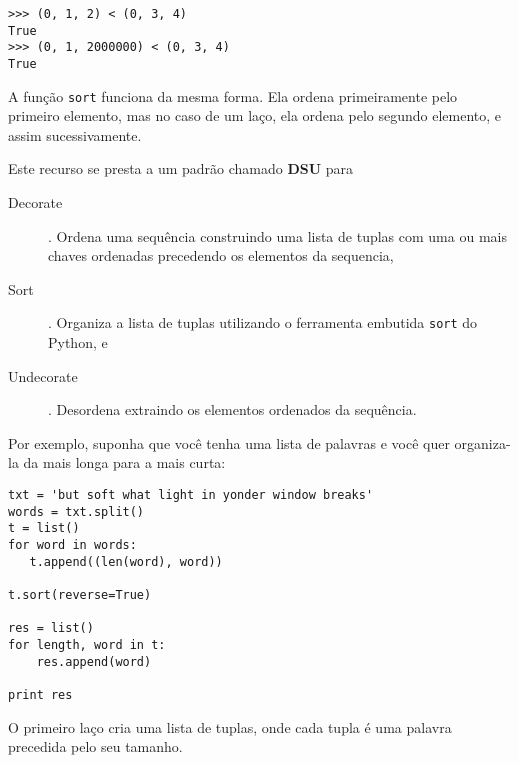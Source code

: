 \beforeverb
\begin{verbatim}
>>> (0, 1, 2) < (0, 3, 4)
True
>>> (0, 1, 2000000) < (0, 3, 4)
True
\end{verbatim}
\afterverb
%
A função {\tt sort} funciona da mesma forma. Ela ordena
primeiramente pelo primeiro elemento, mas no caso de um laço,
ela ordena pelo segundo elemento, e assim sucessivamente.

Este recurso se presta a um padrão chamado {\bf DSU} para

\begin{description}

\item[Decorate]. Ordena uma sequência construindo uma lista de tuplas
com uma ou mais chaves ordenadas precedendo os elementos da sequencia,

\item[Sort]. Organiza a lista de tuplas utilizando o ferramenta embutida 
{\tt sort} do Python, e

\item[Undecorate]. Desordena extraindo os elementos ordenados da sequência.

\end{description}

\label{DSU}

Por exemplo, suponha que você tenha uma lista de palavras e você
quer organiza-la da mais longa para a mais curta:

\beforeverb
\begin{verbatim}
txt = 'but soft what light in yonder window breaks'
words = txt.split()
t = list()
for word in words:
   t.append((len(word), word))

t.sort(reverse=True)

res = list()
for length, word in t:
    res.append(word)

print res
\end{verbatim}
\afterverb
%
O primeiro laço cria uma lista de tuplas, onde cada tupla é
uma palavra precedida pelo seu tamanho.

